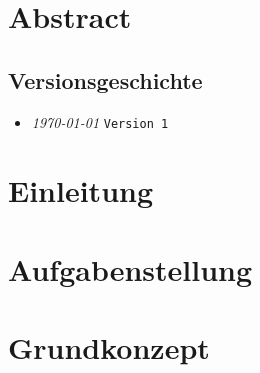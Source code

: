 \documentclass{fhnwreport/fhnwreport}
\begin{document}


\clearpage
\section*{Abstract}
\label{sec:abstract}



\clearpage
\pagestyle{empty}
{
    \renewcommand{\thispagestyle}[1]{}
    \tableofcontents
    \vspace{30mm}
    \subsection*{Versionsgeschichte}
    \begin{itemize}
        \item[]
            \emph{\today} \texttt{Version 1}
    \end{itemize}
}

\clearpage
\setcounter{page}{1}
\pagestyle{headings}

\clearpage
\section{Einleitung}
\label{sec:introduction}


\clearpage
\section{Aufgabenstellung}
\label{sec:aufgabenstellung}



\clearpage
\section{Grundkonzept}
\label{sec:grundkonzept}

\end{document}
